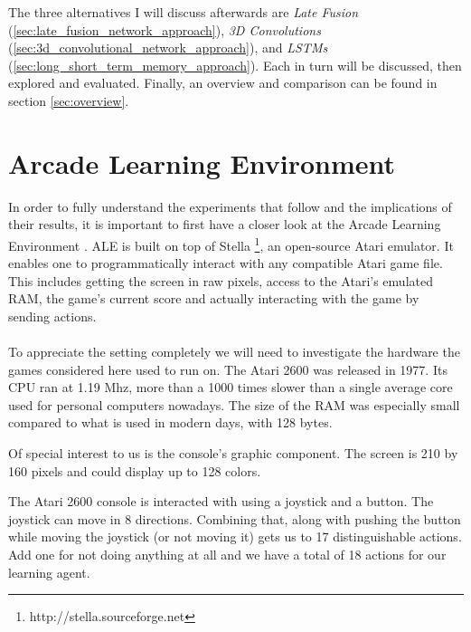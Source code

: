The three alternatives I will discuss afterwards are
\textit{Late Fusion}
(\ref{sec:late_fusion_network_approach}),
\textit{3D Convolutions}
(\ref{sec:3d_convolutional_network_approach}),
and \textit{LSTMs}
(\ref{sec:long_short_term_memory_approach}).
Each in turn will be discussed,
then explored and evaluated.
Finally,
an overview and comparison
can be found in section \ref{sec:overview}.

\section{Arcade Learning Environment}
\label{sec:ale}
In order to fully understand the experiments that follow
and the implications of their results,
it is important to first have a closer
look at the Arcade Learning Environment
\parencite{Bellemare2013}.
ALE is built on top of Stella
\footnote{http://stella.sourceforge.net},
an open-source Atari emulator.
It enables one to programmatically interact
with any compatible Atari game file.
This includes getting the screen in raw pixels,
access to the Atari's emulated RAM,
the game's current score
and actually interacting with the game by sending actions.

\paragraph{}
To appreciate the setting completely we will need to
investigate the hardware the games considered here used to run on.
The Atari 2600 was released in 1977.
Its CPU ran at 1.19 Mhz,
more than a 1000 times slower
than a single average core used for personal computers nowadays.
The size of the RAM was especially small compared to
what is used in modern days, with 128 bytes.

Of special interest to us is the console's graphic component.
The screen is 210 by 160 pixels
and could display up to 128 colors.

The Atari 2600 console is interacted with using
a joystick and a button.
The joystick can move in 8 directions.
Combining that,
along with pushing the button
while moving the joystick
(or not moving it)
gets us to 17 distinguishable actions.
Add one for not doing anything at all
and we have a total of 18 actions for our learning agent.

